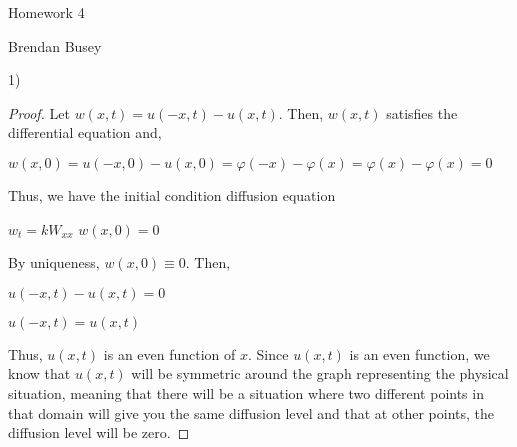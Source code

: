 \documentclass[executivepaper]{article}
\begin{document}
\vspace*{-40mm}

\begin{center}

Homework 4

\end{center}

\begin{flushright}

Brendan Busey

\end{flushright}

\begin{flushleft}

1)

\begin{proof}

Let $w(x,t)=u(-x,t)-u(x,t)$. Then, $w(x,t)$ satisfies the differential equation and, 

\begin{center}

$w(x,0)=u(-x,0)-u(x,0)=\varphi(-x)-\varphi(x)=\varphi(x)-\varphi(x)=0$

\end{center}

Thus, we have the initial condition diffusion equation

\begin{center}

$w_{t}=kW_{xx}$
$w(x,0)=0$

\end{center}

By uniqueness, $w(x,0) \equiv 0$. Then,

\begin{center}

$u(-x,t)-u(x,t)=0$

$u(-x,t)=u(x,t)$

\end{center}

Thus, $u(x,t)$ is an even function of $x$. Since $u(x,t)$ is an even function, we know that $u(x,t)$ will be symmetric around the graph representing the physical situation, meaning that there will be a situation where two different points in that domain will give you the same diffusion level and that at other points, the diffusion level will be zero.

\end{proof}

\end{flushleft}
\end{document}
